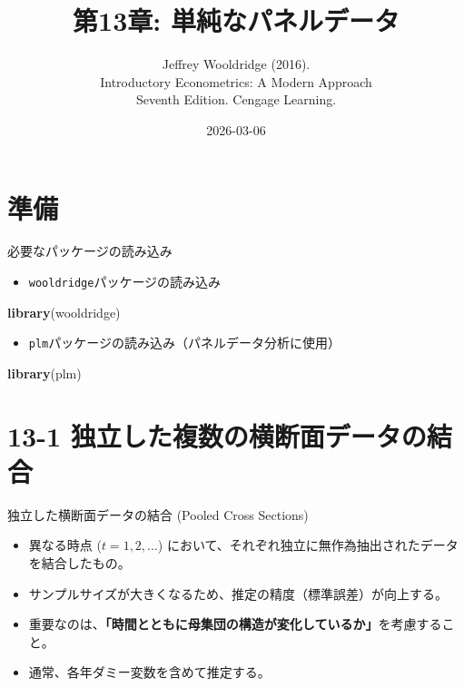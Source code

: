\documentclass[
  ignorenonframetext,
]{beamer}
\title{第13章: 単純なパネルデータ}
\subtitle{Jeffrey Wooldridge (2016).\\
Introductory Econometrics: A Modern Approach\\
Seventh Edition. Cengage Learning.}
\author{}
\date{\vspace{-2.5em}2026-03-06}
\newenvironment{Shaded}{\begin{snugshade}}{\end{snugshade}}
\newcommand{\FunctionTok}[1]{\textcolor[rgb]{0.13,0.29,0.53}{\textbf{#1}}}
\newcommand{\NormalTok}[1]{#1}
\providecommand{\tightlist}{%
  \setlength{\itemsep}{0pt}\setlength{\parskip}{0pt}}
\begin{document}
\frame{\titlepage}

\section{準備}\label{ux6e96ux5099}

\begin{frame}[fragile]{必要なパッケージの読み込み}
\label{ux5fc5ux8981ux306aux30d1ux30c3ux30b1ux30fcux30b8ux306eux8aadux307fux8fbcux307f}
\begin{itemize}
\tightlist
\item
  \texttt{wooldridge}パッケージの読み込み
\end{itemize}

\begin{Shaded}
\begin{Highlighting}[]
\FunctionTok{library}\NormalTok{(wooldridge)}
\end{Highlighting}
\end{Shaded}

\begin{itemize}
\tightlist
\item
  \texttt{plm}パッケージの読み込み（パネルデータ分析に使用）
\end{itemize}

\begin{Shaded}
\begin{Highlighting}[]
\FunctionTok{library}\NormalTok{(plm)}
\end{Highlighting}
\end{Shaded}
\end{frame}

\section{13-1
独立した複数の横断面データの結合}\label{ux72ecux7acbux3057ux305fux8907ux6570ux306eux6a2aux65adux9762ux30c7ux30fcux30bfux306eux7d50ux5408}

\begin{frame}{独立した横断面データの結合 (Pooled Cross Sections)}
\label{ux72ecux7acbux3057ux305fux6a2aux65adux9762ux30c7ux30fcux30bfux306eux7d50ux5408-pooled-cross-sections}
\begin{itemize}
\tightlist
\item
  異なる時点 (\(t=1, 2, \dots\))
  において、それぞれ独立に無作為抽出されたデータを結合したもの。
\item
  サンプルサイズが大きくなるため、推定の精度（標準誤差）が向上する。
\item
  重要なのは、\textbf{「時間とともに母集団の構造が変化しているか」}を考慮すること。
\item
  通常、各年ダミー変数を含めて推定する。
\end{itemize}
\end{frame}
\end{document}
